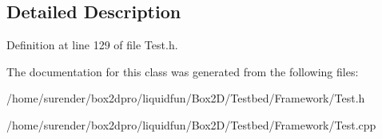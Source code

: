 \subsection{Detailed Description}


Definition at line 129 of file Test.\-h.



The documentation for this class was generated from the following files\-:\begin{DoxyCompactItemize}
\item 
/home/surender/box2dpro/liquidfun/\-Box2\-D/\-Testbed/\-Framework/Test.\-h\item 
/home/surender/box2dpro/liquidfun/\-Box2\-D/\-Testbed/\-Framework/Test.\-cpp\end{DoxyCompactItemize}

